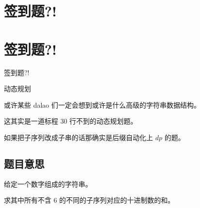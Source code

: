 \def\sectionName{签到题?!}



\isBeamerMode\relax
    \section[\TOCName]{\sectionName}
\fi
\isBeamerMode\relax
    \section[\TOCName\ -\ \sectionName]{\sectionName}
\fi

\begin{frame}

\isBeamerMode\relax
    {\Huge \sectionName}\par
\fi




动态规划

或许某些 dalao 们一定会想到或许是什么高级的字符串数据结构。

这其实是一道标程 30 行不到的动态规划题。

如果把子序列改成子串的话那确实是后缀自动化上 $dp$ 的题。



\end{frame}

\subsection{题目意思}
\begin{frame} %
给定一个数字组成的字符串。

求其中所有不含 $6$ 的不同的子序列对应的十进制数的和。
\end{frame}



